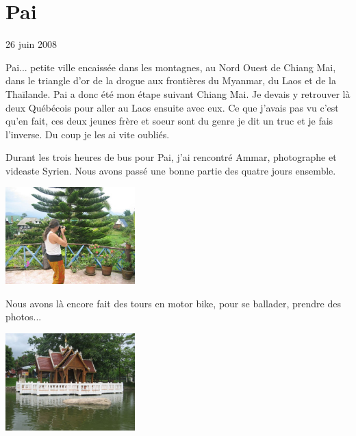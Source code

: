 \section{Pai}

26 juin 2008

\begin{multicols}{2}

Pai... petite ville encaissée dans les montagnes, au Nord Ouest de Chiang Mai, dans le triangle d'or de la drogue aux frontières du Myanmar, du Laos et de la Thaïlande. Pai a donc été mon étape suivant Chiang Mai. Je devais y retrouver là deux Québécois pour aller au Laos ensuite avec eux. Ce que j'avais pas vu c'est qu'en fait, ces deux jeunes frère et soeur sont du genre je dit un truc et je fais l'inverse. Du coup je les ai vite oubliés.

Durant les trois heures de bus pour Pai, j'ai rencontré Ammar, photographe et videaste Syrien. Nous avons passé une bonne partie des quatre jours ensemble.

\smallbreak
\hspace*{-0.65cm}
\includegraphics[width=5cm]{articles/Pai/1214286262syiV.jpg}
\smallbreak

Nous avons là encore fait des tours en motor bike, pour se ballader, prendre des photos...


\smallbreak
\hspace*{-0.65cm}
\includegraphics[width=5cm]{articles/Pai/1214286159uUtC.jpg}
\smallbreak


\end{multicols}
